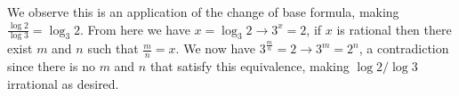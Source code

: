\begin{mdframed}[style=darkAnswer,frametitle={Joe Starr}]
    We observe this is an application of the change of base formula, making 
    $\frac{\log{2}}{\log{3}}=\log_{3}2$. From here we have 
    $x=\log_{3}2 \rightarrow 3^x=2$, if $x$ is rational then there exist $m$ and 
    $n$ such that $\frac{m}{n}=x$. We now have 
    $3^{\frac{m}{n}}=2\rightarrow 3^m=2^n $, a contradiction since there is no 
    $m$ and $n$ that satisfy this equivalence, making $\log{2}/\log{3}$ 
    irrational as desired.
\end{mdframed}



